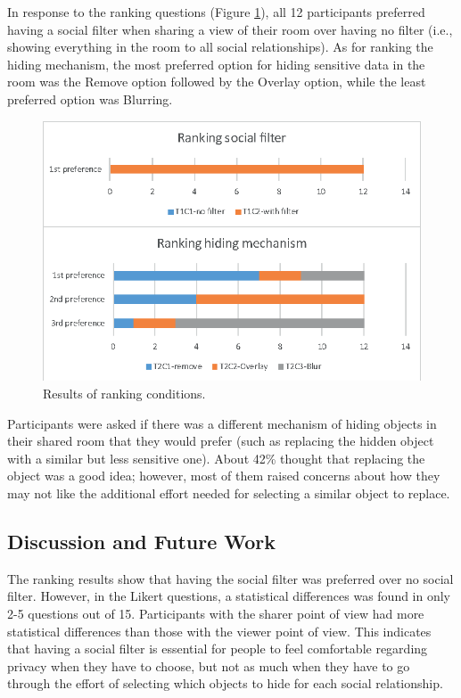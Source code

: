 In response to the ranking questions (Figure \ref{fig:frontier18:result-ranking}), all 12 participants preferred having a social filter when sharing a view of their room over having no filter (i.e., showing everything in the room to all social relationships). As for ranking the hiding mechanism, the most preferred option for hiding sensitive data in the room was the Remove option followed by the Overlay option, while the least preferred option was Blurring. 
\begin{figure}[H]
    \begin{center}
    \includegraphics[width=0.8\linewidth]{images/frontier18/images-07.eps}
    \caption{Results of ranking conditions.}\label{fig:frontier18:result-ranking}
    \end{center}
\end{figure}

Participants were asked if there was a different mechanism of hiding objects in their shared room that they would prefer (such as replacing the hidden object with a similar but less sensitive one). About 42\% thought that replacing the object was a good idea; however, most of them raised concerns about how they may not like the additional effort needed for selecting a similar object to replace.

\subsection{Discussion and Future Work}

The ranking results show that having the social filter was preferred over no social filter. However, in the Likert questions, a statistical differences was found in only 2-5 questions out of 15. Participants with the sharer point of view had more statistical differences than those with the viewer point of view. This indicates that having a social filter is essential for people to feel comfortable regarding privacy when they have to choose, but not as much when they have to go through the effort of selecting which objects to hide for each social relationship.  

